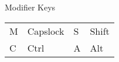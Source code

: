 \begin{conceptbox}[white]{Modifier Keys}
\begin{tabular}{llll}
M&Capslock&
S&Shift\\
C&Ctrl&
A&Alt\\
\end{tabular}
\end{conceptbox}
